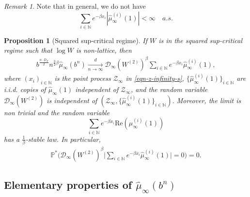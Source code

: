 \documentclass[12pt]{amsart}
\newtheorem{proposition}[theorem]{Proposition}
\theoremstyle{definition}
\theoremstyle{remark}
\newtheorem*{remark*}{Remark}
\newcommand{\N}{\mathbb{N}}
\newcommand{\PP}{\mathbb{P}}
\numberwithin{equation}{section}
\begin{document}
\begin{remark*}
Note that in general, we do not have 
\[
\sum_{i\in \N}  e^{-\beta x_i} |\widehat{\mu}^{(i)}_\infty(1)|<\infty  \quad a.s. 
\]
\end{remark*}





  \begin{proposition}[Squared sup-critical regime]\label{thm-non-cri-super-critical}
If $W$  is in the squared sup-critical regime such that $\log W$ is non-lattice, then 
 \begin{align*}
   b^{\frac{ n \cdot D_F}{2} }n^{\frac{3}{2}\beta} \widehat{\mu}_{\infty}\left(b^{n}\right)\xrightarrow[n\rightarrow\infty]{d} \mathscr{D}_\infty(W^{(2)})^\beta\sum_{i\in \N} e^{-\beta x_i}\widehat{\mu}^{(i)}_\infty(1),
 \end{align*}
 where $(x_i)_{i\in\N}$ is the  point process  $\mathcal{Z}_\infty$ in \eqref{eqn-z-infinity-s},  $\{\widehat{\mu}^{(i)}_\infty(1)\}_{i\in \N}$ are i.i.d. copies of $\widehat{\mu}_\infty(1)$  independent of $\mathcal{Z}_\infty$, and the random variable   $\mathscr{D}_\infty(W^{(2)})$ is independent of   $(\mathcal{Z}_\infty, \{\widehat{\mu}^{(i)}_\infty(1)\}_{i\in \N})$. 
Moreover, the limit is non trivial and  the random variable 
\[
\sum_{i\in \N} e^{-\beta x_i} \mathrm{Re} (\widehat{\mu}^{(i)}_\infty(1))
\]
has a $\frac{1}{\beta}$-stable law.  In particular, 
\begin{align}\label{zero-prob}
\PP^*  \Big( \mathscr{D}_\infty(W^{(2)})^\beta\Big| \sum_{i\in \N} e^{-\beta x_i}  \widehat{\mu}^{(i)}_\infty(1)\Big|=0\Big) =0.  
\end{align}
 \end{proposition}
 


\subsection{Elementary properties of $\widehat{\mu}_\infty(b^n)$}
\end{document}
